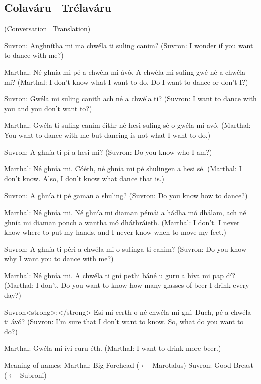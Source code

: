 \subsection{Colav\'{a}ru \textendash\ Tr\'{e}lav\'{a}ru}
(Conversation \textendash\ Translation)

Suvron: Anghn\'{i}tha mi ma chw\'{e}la ti suling canim?
(Suvron: I wonder if you want to dance with me?)

Marthal: N\'{e} ghn\'{i}a mi p\'{e} a chw\'{e}la mi \'{a}v\'{o}. A chw\'{e}la mi suling gw\'{e} n\'{e} a chw\'{e}la mi?
(Marthal: I don't know what I want to do. Do I want to dance or don't I?)

Suvron: Gw\'{e}la mi suling canith ach n\'{e} a chw\'{e}la ti?
(Suvron: I want to dance with you and you don't want to?)

Marthal: Gw\'{e}la ti suling canim \'{e}ithr n\'{e} hesi suling s\'{e} o gw\'{e}la mi av\'{o}.
(Marthal: You want to dance with me but dancing is not what I want to do.)

Suvron: A ghn\'{i}a ti p\'{i} a hesi mi?
(Suvron: Do you know who I am?)

Marthal: N\'{e} ghn\'{i}a mi. C\'{o}\'{e}th, n\'{e} ghn\'{i}a mi p\'{e} shulingen a hesi s\'{e}.
(Marthal: I don't know. Also, I don't know what dance that is.)

Suvron: A ghn\'{i}a ti p\'{e} gaman a shuling?
(Suvron: Do you know how to dance?)

Marthal: N\'{e} ghn\'{i}a mi. N\'{e} ghn\'{i}a mi diaman p\'{e}m\'{a}i a h\'{a}dha m\'{o} dh\'{a}lam, ach n\'{e} ghn\'{i}a mi diaman ponch a wantha m\'{o} dh\'{a}thr\'{a}ieth.
(Marthal: I don't. I never know where to put my hands, and I never know when to move my feet.)

Suvron: A ghn\'{i}a ti p\'{e}ri a chw\'{e}la mi o sulinga ti canim?
(Suvron: Do you know why I want you to dance with me?)

Marthal: N\'{e} ghn\'{i}a mi. A chw\'{e}la ti gn\'{i} pethi b\'{a}n\'{e} u guru a h\'{i}va mi pap d\'{i}?
(Marthal: I don't. Do you want to know how many glasses of beer I drink every day?)

Suvron<strong>:</strong> Esi mi certh o n\'{e} chw\'{e}la mi gn\'{i}. Duch, p\'{e} a chw\'{e}la ti \'{a}v\'{o}?
(Suvron: I'm sure that I don't want to know. So, what do you want to do?)

Marthal: Gw\'{e}la mi \'{i}vi curu \'{e}th.
(Marthal: I want to drink more beer.)

Meaning of names:
Marthal: Big Forehead ($\leftarrow$ Marotalus)
Suvron: Good Breast ($\leftarrow$ Subroni)


